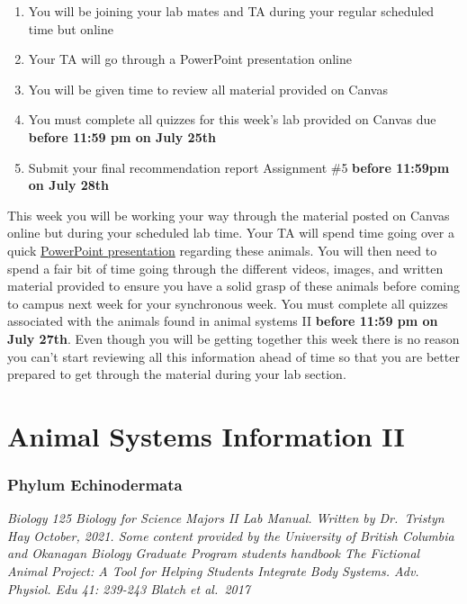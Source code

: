 \documentclass[
]{book}
\providecommand{\tightlist}{%
  \setlength{\itemsep}{0pt}\setlength{\parskip}{0pt}}
\begin{document}
\begin{enumerate}
\def\labelenumi{\arabic{enumi}.}
\tightlist
\item
  You will be joining your lab mates and TA during your regular scheduled time but online
\item
  Your TA will go through a PowerPoint presentation online
\item
  You will be given time to review all material provided on Canvas
\item
  You must complete all quizzes for this week's lab provided on Canvas due \textbf{before 11:59 pm on July 25th}
\item
  Submit your final recommendation report Assignment \#5 \textbf{before 11:59pm on July 28th}
\end{enumerate}

This week you will be working your way through the material posted on Canvas online but during your scheduled lab time. Your TA will spend time going over a quick \href{files/Animal_Systems_Presentation_II.pptx}{PowerPoint presentation} regarding these animals. You will then need to spend a fair bit of time going through the different videos, images, and written material provided to ensure you have a solid grasp of these animals before coming to campus next week for your synchronous week. You must complete all quizzes associated with the animals found in animal systems II \textbf{before 11:59 pm on July 27th}. Even though you will be getting together this week there is no reason you can't start reviewing all this information ahead of time so that you are better prepared to get through the material during your lab section.

\hypertarget{animal-systems-information-ii}{%
\chapter*{Animal Systems Information II}\label{animal-systems-information-ii}}

\hypertarget{phylum-echinodermata}{%
\subsection*{Phylum Echinodermata}\label{phylum-echinodermata}}

\emph{Biology 125 Biology for Science Majors II Lab Manual. Written by Dr.~Tristyn Hay October, 2021. Some content provided by the University of British Columbia and Okanagan Biology Graduate Program students handbook The Fictional Animal Project: A Tool for Helping Students Integrate Body Systems. Adv. Physiol. Edu 41: 239-243 Blatch et al.~2017}
\end{document}
